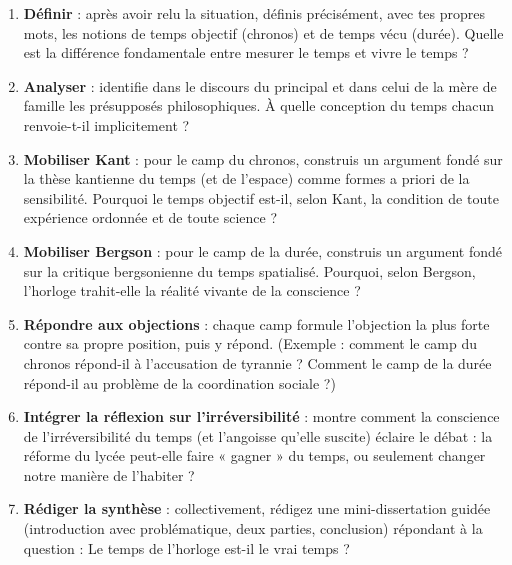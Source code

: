 \documentclass[11pt]{article}
\newcommand{\cle}[1]{{\popxbold\color{popdark}#1}}
\newcounter{popsec}
\newcounter{popsub}
\newcommand{\courssub}[1]{%
  \stepcounter{popsub}%
  \par\vspace{9pt}\noindent{\popxbold\fontsize{11.5}{13}\selectfont\color{popink}{\color{poporange}\thepopsec.\thepopsub}\hspace{6pt}#1}\par\nopagebreak\vspace{4pt}
}
\begin{document}
\begin{enumerate}
\item \textbf{Définir} : après avoir relu la situation, définis précisément, avec tes propres mots, les notions de \cle{temps objectif} (\cle{chronos}) et de \cle{temps vécu} (\cle{durée}). Quelle est la différence fondamentale entre mesurer le temps et vivre le temps ?
\item \textbf{Analyser} : identifie dans le discours du principal et dans celui de la mère de famille les présupposés philosophiques. À quelle conception du temps chacun renvoie-t-il implicitement ?
\item \textbf{Mobiliser Kant} : pour le camp du \cle{chronos}, construis un argument fondé sur la thèse kantienne du temps (et de l'espace) comme \cle{formes a priori de la sensibilité}. Pourquoi le temps objectif est-il, selon Kant, la condition de toute expérience ordonnée et de toute science ?
\item \textbf{Mobiliser Bergson} : pour le camp de la \cle{durée}, construis un argument fondé sur la critique bergsonienne du temps spatialisé. Pourquoi, selon Bergson, l'horloge trahit-elle la réalité vivante de la conscience ?
\item \textbf{Répondre aux objections} : chaque camp formule l'objection la plus forte contre sa propre position, puis y répond. (Exemple : comment le camp du \cle{chronos} répond-il à l'accusation de tyrannie ? Comment le camp de la durée répond-il au problème de la coordination sociale ?)
\item \textbf{Intégrer la réflexion sur l'irréversibilité} : montre comment la conscience de l'\cle{irréversibilité} du temps (et l'\cle{angoisse} qu'elle suscite) éclaire le débat : la réforme du lycée peut-elle faire « gagner » du temps, ou seulement changer notre manière de l'habiter ?
\item \textbf{Rédiger la synthèse} : collectivement, rédigez une mini-dissertation guidée (introduction avec problématique, deux parties, conclusion) répondant à la question : \guillemotleft Le temps de l'horloge est-il le vrai temps ? \guillemotright
\end{enumerate}

\courssub{Ressources à mobiliser}
\end{document}
